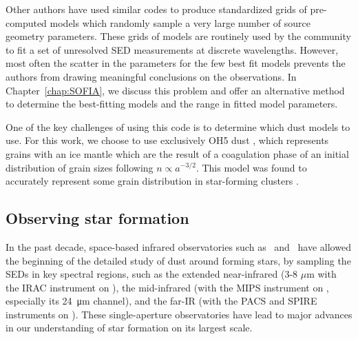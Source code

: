 Other authors \citep[e.g.,][]{Robitaille:2006cb} have used similar codes to produce standardized grids of pre-computed models which randomly sample a very large number of source geometry parameters. These grids of models are routinely used by the community to fit a set of unresolved SED measurements at discrete wavelengths. However, most often the scatter in the parameters for the few best fit models prevents the authors from drawing meaningful conclusions on the observations. In Chapter~\ref{chap:SOFIA}, we discuss this problem and offer an alternative method to determine the best-fitting models and the range
in fitted model parameters.


One of the key challenges of using this code is to determine which dust models to use. For this work, we choose to use exclusively OH5 dust \citep{Ossenkopf:1994tq}, which represents grains with an ice mantle which are the result of a coagulation phase of an initial distribution of grain sizes following $n\propto a^{-3/2}$. This model was found to accurately represent some grain distribution in star-forming clusters \citep[see e.g.][]{Dunham:2010bx}.

\subsection{Observing star formation}

In the past decade, space-based infrared observatories such as \Spitzer\ and \Herschel\ have allowed the beginning of the detailed study of dust around forming stars, by sampling the SEDs in key spectral regions, such as the extended near-infrared (3-8 $\mu$m with the IRAC instrument on \Spitzer), the mid-infrared (with the MIPS instrument on \Spitzer, especially its \SI{24}{\micro\meter} channel), and the far-IR (with the PACS and SPIRE instruments on \Herschel). These single-aperture observatories have lead to major advances in our understanding of star formation on its largest scale.

